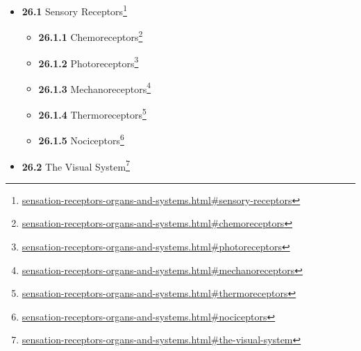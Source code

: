 \documentclass[
]{article}
\providecommand{\tightlist}{%
  \setlength{\itemsep}{0pt}\setlength{\parskip}{0pt}}
\providecommand{\tightlist}{%
  \setlength{\itemsep}{0pt}\setlength{\parskip}{0pt}}
\let\rmarkdownfootnote\footnote%
\def\footnote{\protect\rmarkdownfootnote}
\renewcommand{\href}[2]{#2\footnote{\url{#1}}}
\theoremstyle{definition}
\theoremstyle{definition}
\theoremstyle{definition}
\theoremstyle{remark}
\begin{document}
\begin{itemize}
  \begin{itemize}
  \tightlist
  \item
    \href{sensation-receptors-organs-and-systems.html\#sensory-receptors}{\emph{}\textbf{26.1}
    Sensory Receptors}

    \begin{itemize}
    \tightlist
    \item
      \href{sensation-receptors-organs-and-systems.html\#chemoreceptors}{\emph{}\textbf{26.1.1}
      Chemoreceptors}
    \item
      \href{sensation-receptors-organs-and-systems.html\#photoreceptors}{\emph{}\textbf{26.1.2}
      Photoreceptors}
    \item
      \href{sensation-receptors-organs-and-systems.html\#mechanoreceptors}{\emph{}\textbf{26.1.3}
      Mechanoreceptors}
    \item
      \href{sensation-receptors-organs-and-systems.html\#thermoreceptors}{\emph{}\textbf{26.1.4}
      Thermoreceptors}
    \item
      \href{sensation-receptors-organs-and-systems.html\#nociceptors}{\emph{}\textbf{26.1.5}
      Nociceptors}
    \end{itemize}
  \item
    \href{sensation-receptors-organs-and-systems.html\#the-visual-system}{\emph{}\textbf{26.2}
    The Visual System}


\end{itemize}
\end{itemize}
\end{document}
